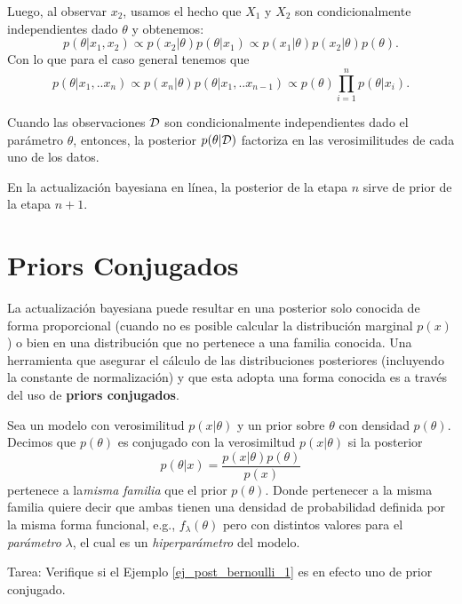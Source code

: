 Luego, al observar $x_2$, usamos el hecho que $X_1$ y $X_2$ son condicionalmente independientes dado $\theta$ y obtenemos: 
$$
p(\theta | x_1,x_2) \propto 
p(x_2|\theta) p(\theta|x_1) \propto p(x_1 |\theta) p(x_2|\theta) p(\theta) . 
$$
Con lo que para el caso general tenemos que 
$$
p(\theta | x_1,..x_n) \propto p(x_n|\theta) p(\theta|x_1,..x_{n-1}) \propto p(\theta) \prod_{i=1}^n p(\theta | x_i).
$$

\begin{remark}
Cuando las observaciones ${\mathcal D}$ son condicionalmente independientes dado el parámetro $\theta$, entonces, la posterior $p(\theta|{\mathcal D})$ factoriza en las verosimilitudes de cada uno de los datos. 
\end{remark}

\begin{remark}
En la actualización bayesiana en línea, la posterior de la etapa $n$ sirve de prior de la etapa $n+1$.
\end{remark}


\section{Priors Conjugados}

La actualización bayesiana puede resultar en una posterior solo conocida de forma proporcional (cuando no es posible calcular la distribución marginal $p(x)$) o bien en una distribución que no pertenece a una familia conocida. Una herramienta que asegurar el cálculo de las distribuciones posteriores (incluyendo la constante de normalización) y que esta adopta una forma conocida es a través del uso de \textbf{priors conjugados}.
\begin{definition}

Sea un modelo con verosimilitud $p(x|\theta)$ y un prior sobre $\theta$ con densidad $p(\theta)$. Decimos que $p(\theta)$ es conjugado con la verosimiltud $p(x|\theta)$ si la posterior 
\begin{equation}
	p(\theta|x) = \frac{p(x|\theta)p(\theta)}{p(x)}
\end{equation}
pertenece a la\textit{misma familia} que el prior $p(\theta)$. Donde pertenecer a la misma familia quiere decir que ambas tienen una densidad de probabilidad definida por la misma forma funcional, e.g., $f_\lambda(\theta)$ pero con distintos valores para el \textit{parámetro} $\lambda$, el cual es un \textit{hiperparámetro} del modelo.
\end{definition}


\begin{example}
\label{ej_post_bernoulli_2}
Tarea: Verifique si el Ejemplo \ref{ej_post_bernoulli_1} es en efecto uno de prior conjugado. 
\end{example}

